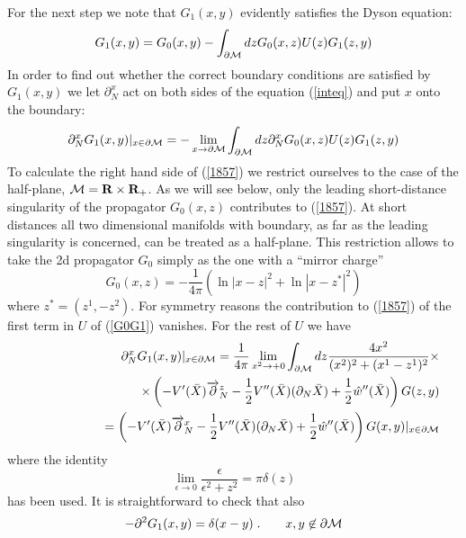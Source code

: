 \documentclass[a4paper,12pt]{article}
\begin{document}
For the next step we note that $G_1(x,y)$ evidently satisfies the Dyson
equation:
\begin{equation}
G_1(x,y)=G_0(x,y)-\int_{\partial {\cal M}} dz G_0(x,z)U(z)
G_1(z,y) \label{inteq}
\end{equation}
In order to find out whether the correct boundary conditions are
satisfied by $G_1(x,y)$ we let
$\partial_N^x$ act on both sides of the equation (\ref{inteq})
and put $x$ onto the boundary: 
\begin{equation}
\partial_N^x G_1(x,y) |_{x\in {\partial{\cal M}}}=
-\lim_{x\to {\partial{\cal M}}} 
\int_{\partial {\cal M}} dz\partial_N^x   G_0(x,z)U(z)
G_1(z,y) \label{1857}
\end{equation}
To calculate the right hand side of (\ref{1857}) we 
restrict ourselves to the case of the half-plane,
 ${\cal M}={\bf R}\times {\bf R}_+$. As we will see below,
only the leading short-distance singularity of the propagator $G_0(x,z)$
contributes to (\ref{1857}). At short distances all two
dimensional manifolds with boundary, as far as the leading singularity is
concerned, can be treated  as a
half-plane. This restriction allows to take the 2d propagator $G_0$ 
simply as the one with a ``mirror charge''
\begin{equation}
G_0(x,z)=-\frac 1{4\pi} (\ln |x-z|^2 + \ln |x-z^*|^2 ) \label{1911}
\end{equation}
where $z^*=(z^1,-z^2)$. For symmetry reasons the contribution 
to (\ref{1857}) of the 
first term in $U$ of  (\ref{G0G1}) vanishes. For the rest
of  $U$ we have
\begin{eqnarray}
&&\partial_N^x G_1(x,y) |_{x\in {\partial{\cal M}}}= \frac 1{4\pi}
\lim_{x^2\to +0} \int_{\partial {\cal M}} dz
\frac {4x^2}{(x^2)^2 +(x^1-z^1)^2} \times \nonumber \\
&&\qquad\qquad\qquad\qquad \times \left(
-V'(\bar X)\overrightarrow{\partial}_N^z -\frac 12 V''(\bar X)
(\partial_N\bar X)
+\frac 12 \hat w''(\bar X) \right) G(z,y) \nonumber \\
&&\qquad\qquad = \left(
-V'(\bar X)\overrightarrow{\partial}_N^x -\frac 12 V''(\bar X)
(\partial_N\bar X)
+\frac 12 \hat w''(\bar X) \right) G(x,y)
|_{x\in {\partial{\cal M}}} \label{1402}
\end{eqnarray}
where the identity
\begin{equation}
\lim_{\epsilon\to 0}\frac \epsilon{\epsilon^2 +z^2} =
\pi \delta (z) \label{limdel}
\end{equation}
has been used. It is straightforward to check that also 
\begin{equation}
-\partial^2 G_1(x,y)=\delta (x-y)\; . \qquad x,y\not\in 
{\partial{\cal M}} \label{1427}
\end{equation}
\end{document}
